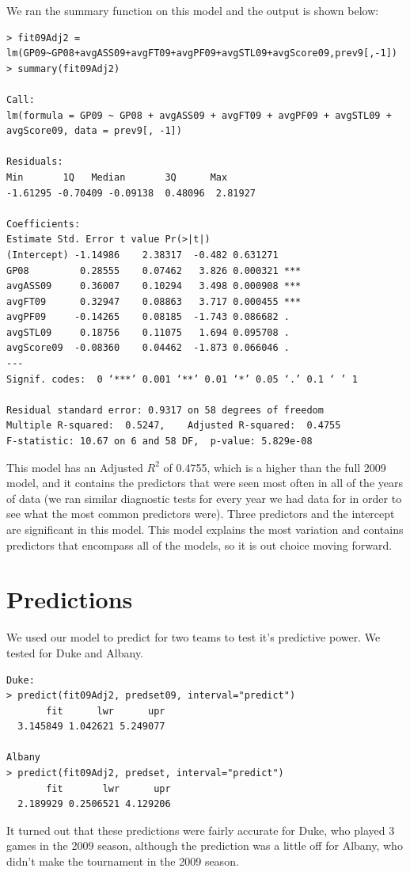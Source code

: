 \documentclass[]{scrartcl}
\begin{document}
We ran the summary function on this model and the output is shown below:
\footnotesize
\begin{verbatim}
> fit09Adj2 = lm(GP09~GP08+avgASS09+avgFT09+avgPF09+avgSTL09+avgScore09,prev9[,-1])
> summary(fit09Adj2)

Call:
lm(formula = GP09 ~ GP08 + avgASS09 + avgFT09 + avgPF09 + avgSTL09 + 
avgScore09, data = prev9[, -1])

Residuals:
Min       1Q   Median       3Q      Max 
-1.61295 -0.70409 -0.09138  0.48096  2.81927 

Coefficients:
Estimate Std. Error t value Pr(>|t|)    
(Intercept) -1.14986    2.38317  -0.482 0.631271    
GP08         0.28555    0.07462   3.826 0.000321 ***
avgASS09     0.36007    0.10294   3.498 0.000908 ***
avgFT09      0.32947    0.08863   3.717 0.000455 ***
avgPF09     -0.14265    0.08185  -1.743 0.086682 .  
avgSTL09     0.18756    0.11075   1.694 0.095708 .  
avgScore09  -0.08360    0.04462  -1.873 0.066046 .  
---
Signif. codes:  0 ‘***’ 0.001 ‘**’ 0.01 ‘*’ 0.05 ‘.’ 0.1 ‘ ’ 1

Residual standard error: 0.9317 on 58 degrees of freedom
Multiple R-squared:  0.5247,	Adjusted R-squared:  0.4755 
F-statistic: 10.67 on 6 and 58 DF,  p-value: 5.829e-08
\end{verbatim}
\normalsize
This model has an Adjusted $R^{2}$ of 0.4755, which is a higher than the full 2009 model, and it contains the predictors that were seen most often in all of the years of data (we ran similar diagnostic tests for every year we had data for in order to see what the most common predictors were). Three predictors and the intercept are significant in this model. This model explains the most variation and contains predictors that encompass all of the models, so it is out choice moving forward.
\section*{Predictions}
We used our model to predict for two teams to test it's predictive power. We tested for Duke and Albany.
\footnotesize
\begin{verbatim}
Duke:
> predict(fit09Adj2, predset09, interval="predict")
       fit      lwr      upr
  3.145849 1.042621 5.249077
  
Albany
> predict(fit09Adj2, predset, interval="predict")
       fit       lwr      upr
  2.189929 0.2506521 4.129206
\end{verbatim}
\normalsize
It turned out that these predictions were fairly accurate for Duke, who played 3 games in the 2009 season, although the prediction was a little off for Albany, who didn't make the tournament in the 2009 season.
\end{document}
